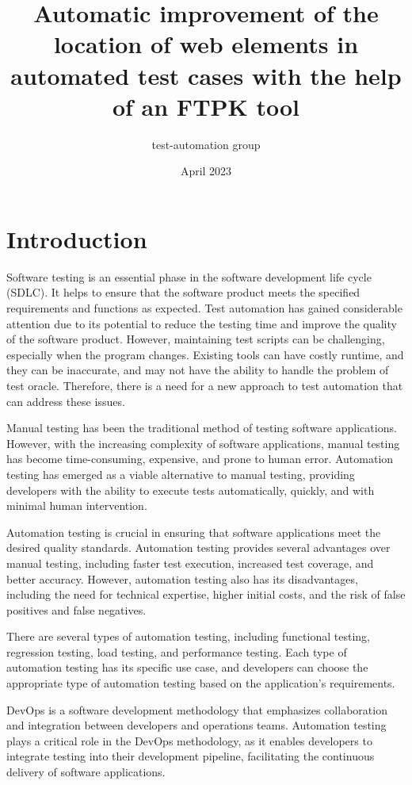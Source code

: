 \documentclass{article}
\title{Automatic improvement of the location of web elements in automated test cases with the help of an FTPK tool}
\author{test-automation group}
\date{April 2023}
\begin{document}
\maketitle

\section{Introduction}

Software testing is an essential phase in the software development life cycle (SDLC). It helps to ensure that the software product meets the specified requirements and functions as expected. Test automation has gained considerable attention due to its potential to reduce the testing time and improve the quality of the software product. However, maintaining test scripts can be challenging, especially when the program changes\cite{gui_testing, gui_test_costs}. Existing tools can have costly runtime, and they can be inaccurate, and may not have the ability to handle the problem of test oracle\cite{test_oracle_ai}. Therefore, there is a need for a new approach to test automation that can address these issues.

Manual testing has been the traditional method of testing software applications. However, with the increasing complexity of software applications, manual testing has become time-consuming, expensive, and prone to human error\cite{gui_test_costs}. Automation testing has emerged as a viable alternative to manual testing, providing developers with the ability to execute tests automatically, quickly, and with minimal human intervention.

Automation testing is crucial in ensuring that software applications meet the desired quality standards. Automation testing provides several advantages over manual testing, including faster test execution, increased test coverage, and better accuracy. However, automation testing also has its disadvantages, including the need for technical expertise, higher initial costs, and the risk of false positives and false negatives.

There are several types of automation testing, including functional testing, regression testing, load testing, and performance testing. Each type of automation testing has its specific use case, and developers can choose the appropriate type of automation testing based on the application's requirements.

DevOps is a software development methodology that emphasizes collaboration and integration between developers and operations teams. Automation testing plays a critical role in the DevOps methodology, as it enables developers to integrate testing into their development pipeline, facilitating the continuous delivery of software applications.
\end{document}
